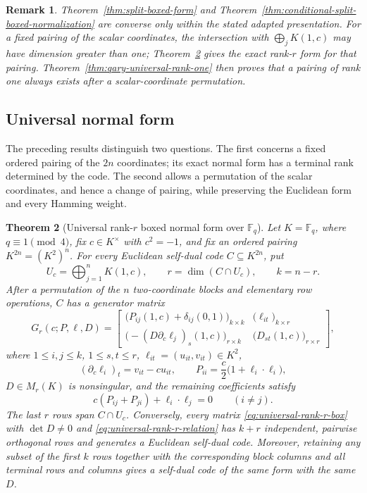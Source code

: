 \documentclass[12pt]{article}
\newtheorem{theorem}{Theorem}[section]
\newtheorem{remark}[theorem]{Remark}
\newcommand{\F}{\mathbb{F}}
\begin{document}
\begin{remark}
\rm
Theorem~\ref{thm:split-boxed-form} and
Theorem~\ref{thm:conditional-split-boxed-normalization} are converse only
within the stated adapted presentation.  For a fixed pairing of the scalar
coordinates, the intersection with \(\bigoplus_jK(1,c)\) may have dimension
greater than one; Theorem~\ref{thm:qary-universal-rank-r} gives the exact
rank-\(r\) form for that pairing.  Theorem~\ref{thm:qary-universal-rank-one}
then proves that a pairing of rank one always exists after a
scalar-coordinate permutation.
\end{remark}

\subsection{Universal normal form}\label{sec:universal-normal-form}

The preceding results distinguish two questions.  The first concerns a
fixed ordered pairing of the \(2n\) coordinates; its exact normal form has a
terminal rank determined by the code.  The second allows a permutation of
the scalar coordinates, and hence a change of pairing, while preserving the
Euclidean form and every Hamming weight.

\begin{theorem}[Universal rank-\(r\) boxed normal form over
\texorpdfstring{$\F_q$}{Fq}]
\label{thm:qary-universal-rank-r}
Let \(K=\F_q\), where \(q\equiv1\pmod4\), fix \(c\in K^\times\) with
\(c^2=-1\), and fix an ordered pairing \(K^{2n}=(K^2)^n\).  For every
Euclidean self-dual code \(C\subseteq K^{2n}\), put
\[
 U_c=\bigoplus_{j=1}^n K(1,c),\qquad
 r=\dim(C\cap U_c),\qquad k=n-r.
\]
After a permutation of the \(n\) two-coordinate blocks and elementary row
operations, \(C\) has a generator matrix
\begin{equation}
G_r(c;P,\ell,D)=
\left[
\begin{array}{c|c}
\bigl(P_{ij}(1,c)+\delta_{ij}(0,1)\bigr)_{k\times k}
  & \bigl(\ell_{it}\bigr)_{k\times r}\\ \hline
\bigl(-(D\partial_c\ell_j)_s(1,c)\bigr)_{r\times k}
  & \bigl(D_{st}(1,c)\bigr)_{r\times r}
\end{array}
\right],
\label{eq:universal-rank-r-box}
\end{equation}
where \(1\le i,j\le k\), \(1\le s,t\le r\),
\(\ell_{it}=(u_{it},v_{it})\in K^2\),
\[
 (\partial_c\ell_i)_t=v_{it}-cu_{it},\qquad
 P_{ii}=\frac c2\bigl(1+\ell_i\cdot\ell_i\bigr),
\]
\(D\in M_r(K)\) is nonsingular, and the remaining coefficients satisfy
\begin{equation}
 c(P_{ij}+P_{ji})+\ell_i\cdot\ell_j=0
 \qquad(i\ne j).
\label{eq:universal-rank-r-relation}
\end{equation}
The last \(r\) rows span \(C\cap U_c\).  Conversely, every matrix
\eqref{eq:universal-rank-r-box} with \(\det D\ne0\) and
\eqref{eq:universal-rank-r-relation} has \(k+r\) independent, pairwise
orthogonal rows and generates a Euclidean self-dual code.  Moreover,
retaining any subset of the first \(k\) rows together with the corresponding
block columns and all terminal rows and columns gives a self-dual code of
the same form with the same \(D\).
\end{theorem}
\end{document}
